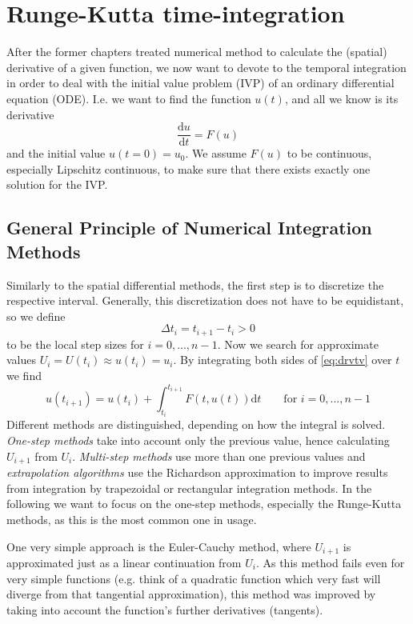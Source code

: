 \section{Runge-Kutta time-integration}

After the former chapters treated numerical method to calculate the (spatial) derivative of a given function, we now want to devote to the temporal integration in order to deal with the initial value problem (IVP) of an ordinary differential equation (ODE). I.e. we want to find the function $u(t)$, and all we know is its derivative
\begin{equation}
  \frac{\mathrm{d} u}{\mathrm{d} t} = F(u)
  \label{eq:drvtv}
\end{equation}
and the initial value $u(t = 0) = u_0$.
We assume $F(u)$ to be continuous, especially Lipschitz continuous, to make sure that there exists exactly one solution for the IVP.
\subsection{General Principle of Numerical Integration Methods}
Similarly to the spatial differential methods, the first step is to discretize the respective interval. Generally, this discretization does not have to be equidistant, so we define
\begin{equation}
  \Delta t_i = t_{i+1} - t_i >0
\end{equation}
to be the local step sizes for $i = 0,..., n-1$.
Now we search for approximate values $U_i = U(t_i) \approx u(t_i) = u_i$.
By integrating both sides of \ref{eq:drvtv} over $t$ we find
\begin{equation}
  u(t_{i+1}) = u(t_i) + \int_{t_i}^{t_{i+1}} F(t,u(t)) \mathrm{d}t \qquad \text{for } i = 0,...,n-1
\end{equation}
Different methods are distinguished, depending on how the integral is solved. \emph{One-step methods} take into account only the previous value, hence calculating $U_{i+1}$ from $U_i$. \emph{Multi-step methods} use more than one previous values and \emph{extrapolation algorithms} use the Richardson approximation to improve results from integration by trapezoidal or rectangular integration methods.
In the following we want to focus on the one-step methods, especially the Runge-Kutta methods, as this is the most common one in usage.

One very simple approach is the Euler-Cauchy method, where $U_{i+1}$ is approximated just as a linear continuation from $U_i$. As this method fails even for very simple functions (e.g. think of a quadratic function which very fast will diverge from that tangential approximation), this method was improved by taking into account the function's further derivatives (tangents).

